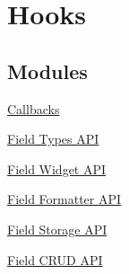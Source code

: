 \hypertarget{group__hooks}{
\section{Hooks}
\label{group__hooks}
}
\subsection*{Modules}
\begin{DoxyCompactItemize}
\item 
\hyperlink{group__callbacks}{Callbacks}
\item 
\hyperlink{group__field__types}{Field Types API}
\item 
\hyperlink{group__field__widget}{Field Widget API}
\item 
\hyperlink{group__field__formatter}{Field Formatter API}
\item 
\hyperlink{group__field__storage}{Field Storage API}
\item 
\hyperlink{group__field__crud}{Field CRUD API}
\end{DoxyCompactItemize}
